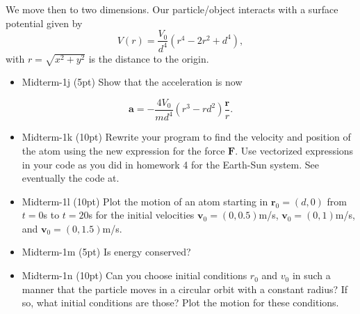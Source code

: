 \documentclass[%
oneside,                 %
final,                   %
10pt]{article}
\begin{document}
\noindent
We move then to two dimensions. Our particle/object interacts with a surface potential given by
\[
V(r)=\frac{V_0}{d^4}\left(r^4-2r^2+d^4\right),
\]
with $r=\sqrt{x^2+y^2}$ is the distance to the origin.

\begin{itemize}
\item Midterm-1j (5pt) Show that the acceleration is now
\end{itemize}

\noindent
\[
\bm{a}=-\frac{4V_0}{md^4}\left(r^3-rd^2\right)\frac{\bm{r}}{r}.
\]

\begin{itemize}
\item Midterm-1k (10pt) Rewrite your program to find the velocity and position of the atom using the new expression for the force $\bm{F}$. Use vectorized expressions in your code as you did in homework 4 for the Earth-Sun system. See eventually the code at.

\item Midterm-1l  (10pt) Plot the motion of an atom starting in $\bm{r}_0=(d,0)$ from $t=0$s to $t=20$s for the initial velocities $\bm{v}_0= (0,0.5)$m/s, $\bm{v}_0= (0,1)$m/s, and $\bm{v}_0= (0,1.5)$m/s.

\item Midterm-1m (5pt) Is energy conserved? 

\item Midterm-1n  (10pt) Can you choose initial conditions $r_0$ and $v_0$ in such a manner that the particle moves in a circular orbit with a constant radius? If so, what initial conditions are those? Plot the motion for these conditions.
\end{itemize}

\noindent

\end{document}
